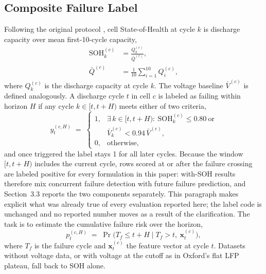 \documentclass[preprint,12pt]{elsarticle}
\begin{document}
\subsection{Composite Failure Label}
Following the original protocol \cite{shikdar2026learning}, cell State-of-Health at cycle $k$ is discharge capacity over mean first-10-cycle capacity,
\begin{equation}\label{eq:soh}
\begin{aligned}
\mathrm{SOH}_k^{(c)} &= \frac{Q_k^{(c)}}{\bar{Q}^{(c)}},\\[2pt]
\bar{Q}^{(c)} &= \frac{1}{10}\sum_{i=1}^{10} Q_i^{(c)},
\end{aligned}
\end{equation}
where $Q_k^{(c)}$ is the discharge capacity at cycle $k$. The voltage baseline $\bar{V}^{(c)}$ is defined analogously. A discharge cycle $t$ in cell $c$ is labeled as failing within horizon $H$ if any cycle $k\in[t,t{+}H)$ meets either of two criteria,
\begin{equation}\label{eq:label}
y_t^{(c,H)} \;=\; \begin{cases}
1, & \exists\, k\in[t,t{+}H):\ \mathrm{SOH}_k^{(c)}\le 0.80 \ \text{or}\\[2pt]
& \bar{V}_k^{(c)} < 0.94\,\bar{V}^{(c)},\\[2pt]
0, & \text{otherwise,}
\end{cases}
\end{equation}
and once triggered the label stays 1 for all later cycles. Because the window $[t,t{+}H)$ includes the current cycle, rows scored at or after the failure crossing are labeled positive for every formulation in this paper: with-SOH results therefore mix concurrent failure detection with future failure prediction, and Section~3.3 reports the two components separately. This paragraph makes explicit what was already true of every evaluation reported here; the label code is unchanged and no reported number moves as a result of the clarification. The task is to estimate the cumulative failure risk over the horizon,
\begin{equation}\label{eq:risk}
p_t^{(c,H)} \;=\; \Pr\!\bigl(T_f \le t{+}H \mid T_f > t,\ \mathbf{x}_t^{(c)}\bigr),
\end{equation}
where $T_f$ is the failure cycle and $\mathbf{x}_t^{(c)}$ the feature vector at cycle $t$. Datasets without voltage data, or with voltage at the cutoff as in Oxford's flat LFP plateau, fall back to SOH alone.
\end{document}
